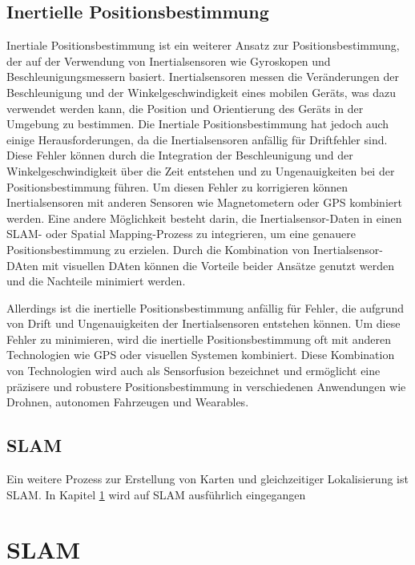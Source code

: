     \subsection{Inertielle Positionsbestimmung} \label{inertielle_positionsbestimmung:subsection}
    Inertiale Positionsbestimmung ist ein weiterer Ansatz zur Positionsbestimmung, der auf der Verwendung von Inertialsensoren wie Gyroskopen und Beschleunigungsmessern basiert. Inertialsensoren messen die Veränderungen der Beschleunigung und der Winkelgeschwindigkeit eines mobilen Geräts, was dazu verwendet werden kann, die Position und Orientierung des Geräts in der Umgebung zu bestimmen. Die Inertiale Positionsbestimmung hat jedoch auch einige Herausforderungen, da die Inertialsensoren anfällig für Driftfehler sind. Diese Fehler können durch die Integration der Beschleunigung und der Winkelgeschwindigkeit über die Zeit entstehen und zu Ungenauigkeiten bei der Positionsbestimmung führen. Um diesen Fehler zu korrigieren können Inertialsensoren mit anderen Sensoren wie Magnetometern oder GPS kombiniert werden.
    Eine andere Möglichkeit besteht darin, die Inertialsensor-Daten in einen SLAM- oder Spatial Mapping-Prozess zu integrieren, um eine genauere Positionsbestimmung zu erzielen. Durch die Kombination von Inertialsensor-DAten mit visuellen DAten können die Vorteile beider Ansätze genutzt werden und die Nachteile minimiert werden.


Allerdings ist die inertielle Positionsbestimmung anfällig für Fehler, die aufgrund von Drift und Ungenauigkeiten der Inertialsensoren entstehen können. Um diese Fehler zu minimieren, wird die inertielle Positionsbestimmung oft mit anderen Technologien wie GPS oder visuellen Systemen kombiniert. Diese Kombination von Technologien wird auch als Sensorfusion bezeichnet und ermöglicht eine präzisere und robustere Positionsbestimmung in verschiedenen Anwendungen wie Drohnen, autonomen Fahrzeugen und Wearables.

\subsection{SLAM}

Ein weitere Prozess zur Erstellung von Karten und gleichzeitiger Lokalisierung ist \ac{SLAM}. 
In Kapitel \ref{SLAM:section} wird auf \ac{SLAM} ausführlich eingegangen
\section{SLAM}\label{SLAM:section} 

